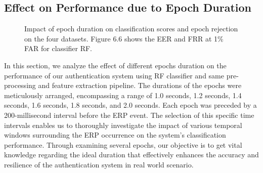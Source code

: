 \subsection{Effect on Performance due to Epoch Duration}
\begin{figure}%
    \centering
    \qquad
    \caption{Impact of epoch duration on classification scores and epoch rejection on the four datasets. Figure 6.6 shows the EER and FRR at 1\% FAR for classifier RF.}%
    \label{fig: Effect of Epochs Duration}%
\end{figure}
In this section, we analyze the effect of different epochs duration on the performance of our authentication system using RF classifier and same pre-processing and feature extraction pipeline. The durations of the epochs were meticulously arranged, encompassing a range of 1.0 seconds, 1.2 seconds, 1.4 seconds, 1.6 seconds, 1.8 seconds, and 2.0 seconds. Each epoch was preceded by a 200-millisecond interval before the ERP event. The selection of this specific time intervals enables us to thoroughly investigate the impact of various temporal windows surrounding the ERP occurrence on the system's classification performance. Through examining several epochs, our objective is to get vital knowledge regarding the ideal duration that effectively enhances the accuracy and resilience of the authentication system in real world scenario. 
\smallskip

